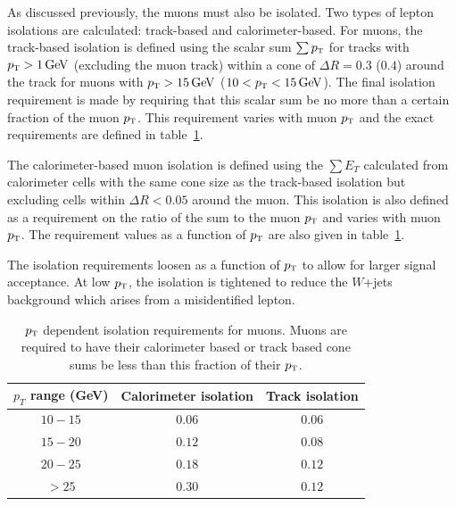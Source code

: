 As discussed previously, the muons must also be isolated. Two types of lepton isolations are calculated: track-based and calorimeter-based. For muons, the track-based isolation is defined using the scalar sum  $\sum p_{\textrm{\footnotesize\sc t}}$ for tracks with $\pT > 1 \GeV$ (excluding the muon track) within a cone of  $\Delta R = 0.3$ ($0.4$) around the track for muons with $\pT > 15 \GeV$ ($10 < \pT < 15 \GeV$). The final isolation requirement is made by requiring that this scalar sum be no more than a certain fraction of the muon $p_{\textrm{\footnotesize\sc t}}$. This requirement varies with muon $p_{\textrm{\footnotesize\sc t}}$ and the exact requirements are defined in table~\ref{tab:muonisocuts}.

The calorimeter-based muon isolation is defined using the $\sum E_{T}$ calculated from calorimeter cells with the same cone size as the track-based isolation but excluding cells within $\Delta R < 0.05$ around the muon. This isolation is also defined as a requirement on the ratio of the sum to the muon $p_{\textrm{\footnotesize\sc t}}$ and varies with muon $p_{\textrm{\footnotesize\sc t}}$. The requirement values as a function of $p_{\textrm{\footnotesize\sc t}}$ are also given in table~\ref{tab:muonisocuts}.

The isolation requirements loosen as a function of $p_{\textrm{\footnotesize\sc t}}$ to allow for larger signal acceptance. At low $p_{\textrm{\footnotesize\sc t}}$, the isolation is tightened to reduce the $W$+jets background which arises from a misidentified lepton. 

\begin{table}[h!]
\centering
\captionsetup{justification=centering}

\hspace{-10pt}
\begin{tabular}{|c|c|c|}
\hline
$p_T$ range (GeV) & Calorimeter isolation & Track isolation\\ \hline \hline
$10-15$ & $0.06$ & $0.06$ \\ \hline
$15-20$ & $0.12$ & $0.08$ \\ \hline
$20-25$ & $0.18$ & $0.12$ \\ \hline
$> 25$ & $0.30$ & $0.12$ \\ \hline
\end{tabular}

\caption{
$p_{\textrm{\footnotesize\sc t}}$ dependent isolation requirements for muons. Muons are required to have their calorimeter based or track based cone sums be less than this fraction of their $p_{\textrm{\footnotesize\sc t}}$.
}
\label{tab:muonisocuts}
\end{table}


